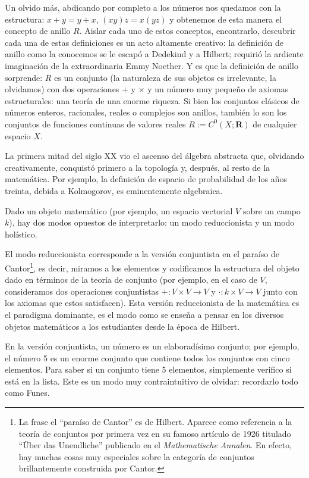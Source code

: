 \documentclass[12pt,a4paper, spanish]{amsart}
\numberwithin{equation}{section}
\theoremstyle{plain}
\theoremstyle{definition}
\begin{document}
Un olvido más, abdicando por completo a los números nos quedamos con la estructura: $x+y=y+x$, $(xy)z=x(yz)$ y obtenemos de esta manera el concepto de anillo $R$. Aislar cada uno de estos conceptos, encontrarlo, descubrir cada una de estas definiciones es un acto altamente creativo: la definición de anillo como la conocemos se le escapó a Dedekind y a Hilbert; requirió la ardiente imaginación de la extraordinaria Emmy Noether\autocite{noether1921idealtheorie}. Y es que la definición de anillo sorprende: $R$ es un conjunto (la naturaleza de sus objetos es irrelevante, la olvidamos) con dos operaciones $+$ y $\times$ y un número muy pequeño de axiomas estructurales: una teoría de una enorme riqueza. Si bien los conjuntos clásicos de números enteros, racionales, reales o complejos son anillos, también lo son los conjuntos de funciones continuas de valores reales $R:=C^0(X;\mathbf{R})$ de cualquier espacio $X$.

La primera mitad del siglo XX vio el ascenso del álgebra abstracta que, olvidando creativamente, conquistó primero a la topología y, después, al resto de la matemática. Por ejemplo, la definición de espacio de probabilidad de los años treinta, debida a Kolmogorov, es eminentemente algebraica. 

Dado un objeto matemático (por ejemplo, un espacio vectorial $V$ sobre un campo $k$), hay dos modos opuestos de interpretarlo: un modo reduccionista y un modo holístico. 

El modo reduccionista corresponde a la versión conjuntista en el paraíso de Cantor\footnote{La frase el ``paraíso de Cantor'' es de Hilbert. Aparece como referencia a la teoría de conjuntos por primera vez en su famoso artículo de 1926 titulado ``Über das Unendliche'' publicado en el \emph{Mathematische Annalen}. En efecto, hay muchas cosas muy especiales sobre la categoría de conjuntos brillantemente construida por Cantor.}, es decir, miramos a los elementos y codificamos la estructura del objeto dado en términos de la teoría de conjunto (por ejemplo, en el caso de $V$, consideramos dos operaciones conjuntistas $+:V\times V \to V$ y $\cdot: k\times V \to V$ junto con los axiomas que estos satisfacen). Esta versión reduccionista de la matemática es el paradigma dominante, es el modo como se enseña a pensar en los diversos objetos matemáticos a los estudiantes  desde la época de Hilbert. 

En la versión conjuntista, un número es un elaboradísimo conjunto; por ejemplo, el número 5 es un enorme conjunto que contiene todos los conjuntos con cinco elementos. Para saber si un conjunto tiene 5 elementos, simplemente verifico si está en la lista. Este es un modo muy contraintuitivo de olvidar: recordarlo todo como Funes.
\end{document}

